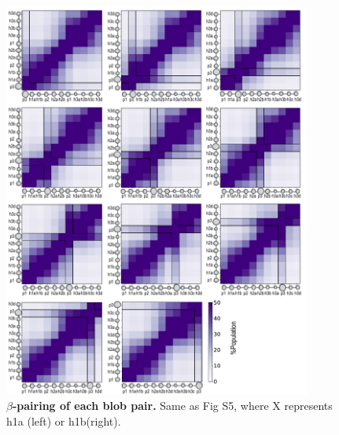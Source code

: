 \documentclass[10pt,letterpaper]{article}
\begin{document}
\begin{figure}[!ht]
\includegraphics[scale=0.5,width=0.9\textwidth,trim={0 0cm 0 0cm},clip]{./figures/S6.pdf}
\caption{{\bf $\beta$-pairing of each blob pair.} Same as Fig S5, where X represents h1a (left) or h1b(right).} 
\label{S5} 
\end{figure}
\end{document}
